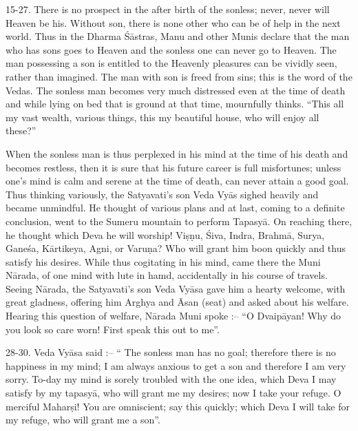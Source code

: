 15-27. There is no prospect in the after birth of the sonless; never, never will Heaven be his. Without son, there is none other who can be of help in the next world. Thus in the Dharma \'S\=astras, Manu and other Munis declare that the man who has sons goes to Heaven and the sonless one can never go to Heaven. The man possessing a son is entitled to the Heavenly pleasures can be vividly seen, rather than imagined. The man with son is freed from sins; this is the word of the Vedas. The sonless man becomes very much distressed even at the time of death and while lying on bed that is ground at that time, mournfully thinks. ``This all my vast wealth, various things, this my beautiful house, who will enjoy all these?''

When the sonless man is thus perplexed in his mind at the time of his death and becomes restless, then it is sure that his future career is full misfortunes; unless one's mind is calm and serene at the time of death, can never attain a good goal. Thus thinking variously, the Satyavati's son Veda Vy\=as sighed heavily and became unmindful. He thought of various plans and at last, coming to a definite conclusion, went to the Sumeru mountain to perform Tapasy\=a. On reaching there, he thought which Deva he will worship! Vi\d{s}\d{n}u, \'Siva, Indra, Brahm\=a, Surya, Gane\'sa, K\=artikeya, Agni, or Varu\d{n}a? Who will grant him boon quickly and thus satisfy his desires. While thus cogitating in his mind, came there the Muni N\=arada, of one mind with lute in hamd, accidentally in his course of travels. Seeing N\=arada, the Satyavati's son Veda Vy\=asa gave him a hearty welcome, with great gladness, offering him Arghya and \=Asan (seat) and asked about his welfare. Hearing this question of welfare, N\=arada Muni spoke :-- ``O Dvaip\=ayan! Why do you look so care worn! First speak this out to me''.

28-30. Veda Vy\=asa said :-- `` The sonless man has no goal; therefore there is no happiness in my mind; I am always anxious to get a son and therefore I am very sorry. To-day my mind is sorely troubled with the one idea, which Deva I may satisfy by my tapasy\=a, who will grant me my desires; now I take your refuge. O merciful Mahar\d{s}i! You are omniscient; say this quickly; which Deva I will take for my refuge, who will grant me a son''.

